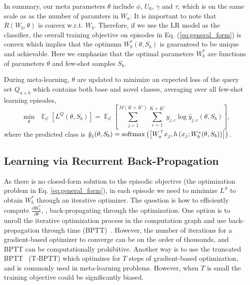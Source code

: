 In summary, our meta parameters $\theta$ include $\phi$, $U_0$, $\gamma$ and $\tau$, which is on
 the same scale as as the number of paramters in $W_a$. It is important to note that $R(W_b,
 \theta)$ is convex w.r.t. $W_b$. Therefore, if we use the LR model as the classifier, the overall
 training objective on episodes in Eq. (\ref{eq:general_form}) is convex which implies that the
 optimum $W_b^*(\theta,S_b)$ is guaranteed to be unique and achievable. Here we emphasize that the
 optimal parameters $W_b^*$ are functions of parameters $\theta$ and few-shot samples $S_b$.

During meta-learning, $\theta$ are updated to minimize an expected loss of the query set $Q_{a+b}$
which contains both base and novel classes, averaging over all few-shot learning episodes,
\begin{equation}
\min_{\theta} ~~ \mathop{\mathbb{E}}_{\mathcal{E}} \left[ L^Q(\theta,S_b) \right] =
\mathop{\mathbb{E}}_{\mathcal{E}}\left[\sum_{j=1}^{M(K+K')} \sum_{c=1}^{K+K'} y_{j,c} \log
\hat{y}_{j,c}(\theta,S_b)\right],
\end{equation}
where the predicted class is
$
\hat{y}_{j}(\theta,S_b) = \mathrm{softmax}\left(\left[W_{a}^{\top} x_j, h \left( x_j;
W_{b}^{\ast}(\theta,S_b) \right) \right] \right)$.

\subsection{Learning via Recurrent Back-Propagation}
As there is no closed-form solution to the episodic objective (the optimization problem in Eq.
\ref{eq:general_form}), in each episode we need to minimize $L^S$ to obtain $W^*_b$ through an
iterative optimizer. The question is how to efficiently compute $\frac{\partial W_b^*}{\partial
\theta}$, \ie, back-propagating through the optimization. One option is to unroll the iterative
optimization process in the computation graph and use back-propagation through time (BPTT)~\citep{bptt}. 
However, the number of iterations for a gradient-based optimizer to converge can be on
the order of thousands, and BPTT can be computationally prohibitive. Another way is to use the
truncated BPTT~\citep{tbptt} (T-BPTT) which optimizes for $T$ steps of gradient-based optimization,
and is commonly used in meta-learning problems. However, when $T$ is small the training objective
could be significantly biased.

